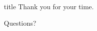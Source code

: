 \documentclass[xcolor={dvipsnames,table}]{beamer}
\begin{document}
\begin{frame}[c]
	\begin{center}
		\huge
		\begin{beamercolorbox}[sep=18pt,center,shadow=true,rounded=true]{title}
			Thank you for your time.\par%
		\end{beamercolorbox}
		\vspace{2em}
		Questions?
	\end{center}

\end{frame}
\end{document}
